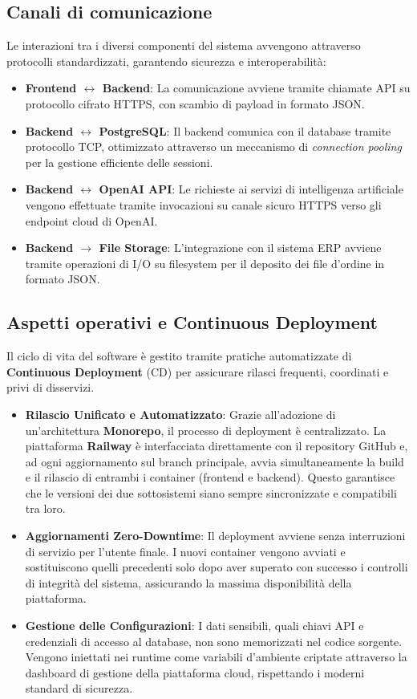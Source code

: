 \documentclass[a4paper, 11pt, oneside]{scrartcl}
\begin{document}
\subsection{Canali di comunicazione}
Le interazioni tra i diversi componenti del sistema avvengono attraverso protocolli standardizzati, garantendo sicurezza e interoperabilità:
\begin{itemize}
    \item \textbf{Frontend $\leftrightarrow$ Backend}: La comunicazione avviene tramite chiamate API su protocollo cifrato HTTPS, con scambio
      di payload in formato JSON.
    \item \textbf{Backend $\leftrightarrow$ PostgreSQL}: Il backend comunica con il database tramite protocollo TCP, ottimizzato attraverso un
      meccanismo di \textit{connection pooling} per la gestione efficiente delle sessioni.
    \item \textbf{Backend $\leftrightarrow$ OpenAI API}: Le richieste ai servizi di intelligenza artificiale vengono effettuate tramite invocazioni
       su canale sicuro HTTPS verso gli endpoint cloud di OpenAI.
    \item \textbf{Backend $\rightarrow$ File Storage}: L'integrazione con il sistema ERP avviene tramite operazioni di I/O su filesystem per il
      deposito dei file d'ordine in formato JSON.
\end{itemize}

\subsection{Aspetti operativi e Continuous Deployment}
Il ciclo di vita del software è gestito tramite pratiche automatizzate di \textbf{Continuous Deployment} (CD) per assicurare rilasci
frequenti, coordinati e privi di disservizi.
\begin{itemize}
    \item \textbf{Rilascio Unificato e Automatizzato}: Grazie all'adozione di un'architettura \textbf{Monorepo}, il processo di deployment è
     centralizzato. La piattaforma \textbf{Railway} è interfacciata direttamente con il repository GitHub e, ad ogni aggiornamento sul branch principale,
     avvia simultaneamente la build e il rilascio di entrambi i container (frontend e backend). Questo garantisce che le versioni dei due sottosistemi
     siano sempre sincronizzate e compatibili tra loro.
    \item \textbf{Aggiornamenti Zero-Downtime}: Il deployment avviene senza interruzioni di servizio per l'utente finale. I nuovi container vengono
     avviati e sostituiscono quelli precedenti solo dopo aver superato con successo i controlli di integrità del sistema, assicurando la massima
     disponibilità della piattaforma.
    \item \textbf{Gestione delle Configurazioni}: I dati sensibili, quali chiavi API e credenziali di accesso al database, non sono memorizzati nel
     codice sorgente. Vengono iniettati nei runtime come variabili d'ambiente criptate attraverso la dashboard di gestione della piattaforma cloud,
     rispettando i moderni standard di sicurezza.
\end{itemize}
\end{document}
